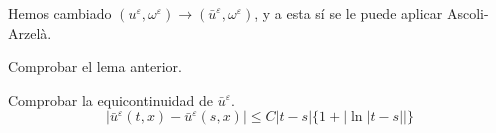 Hemos cambiado $(u^\varepsilon, \omega^\varepsilon) \to (\bar{u}^\varepsilon, \omega^\varepsilon)$, y a esta sí se le puede aplicar Ascoli-Arzelà.

\begin{ejercicio}
    Comprobar el lema anterior.
\end{ejercicio}

\begin{ejercicio}
    Comprobar la equicontinuidad de $\bar{u}^\varepsilon$.
    $$|\bar{u}^\varepsilon(t,x) - \bar{u}^\varepsilon(s,x)| \leq C |t-s| \{1 + |\ln|t-s||\}$$
\end{ejercicio}




